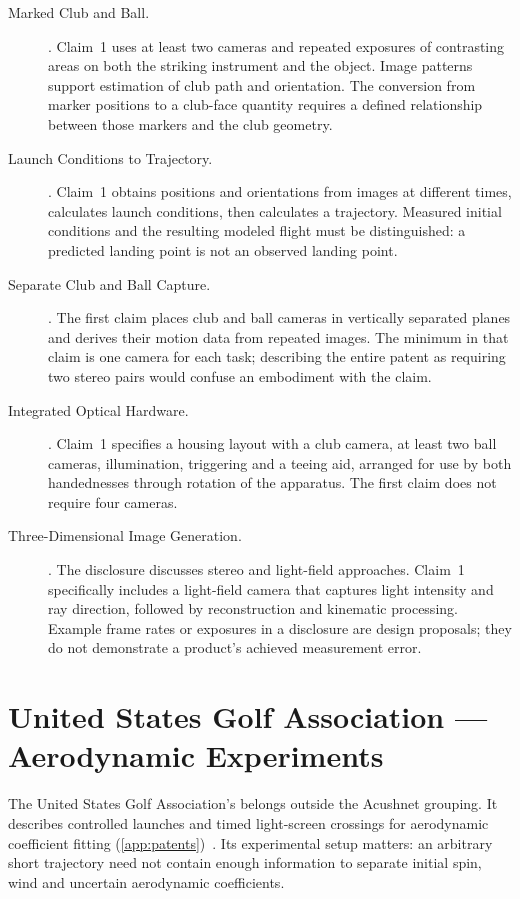 \begin{description}
\item[Marked Club and Ball.]
.
Claim~1 uses at least two cameras and repeated exposures of contrasting
areas on both the striking instrument and the object. Image patterns
support estimation of club path and orientation. The conversion from
marker positions to a club-face quantity requires a defined relationship
between those markers and the club geometry.
\item[Launch Conditions to Trajectory.]
.
Claim~1 obtains positions and orientations from images at different times,
calculates launch conditions, then calculates a trajectory. Measured
initial conditions and the resulting modeled flight must be distinguished:
a predicted landing point is not an observed landing point.
\item[Separate Club and Ball Capture.]
.
The first claim places club and ball cameras in vertically separated
planes and derives their motion data from repeated images. The minimum
in that claim is one camera for each task; describing the entire patent
as requiring two stereo pairs would confuse an embodiment with the claim.
\item[Integrated Optical Hardware.]
.
Claim~1 specifies a housing layout with a club camera, at least two ball
cameras, illumination, triggering and a teeing aid, arranged for use by
both handednesses through rotation of the apparatus. The first claim does not require four cameras.
\item[Three-Dimensional Image Generation.]
.
The disclosure discusses stereo and light-field approaches. Claim~1
specifically includes a light-field camera that captures light intensity
and ray direction, followed by reconstruction and kinematic processing.
Example frame rates or exposures in a disclosure are design proposals;
they do not demonstrate a product's achieved measurement error.
\end{description}

\section{United States Golf Association --- Aerodynamic Experiments}

The United States Golf Association's  belongs outside the Acushnet grouping.
It describes controlled launches and timed light-screen crossings for aerodynamic coefficient fitting (\cref{app:patents})~\cite{us6186002}.
Its experimental setup matters: an arbitrary short trajectory need not contain enough information to separate initial spin, wind and uncertain aerodynamic coefficients.

